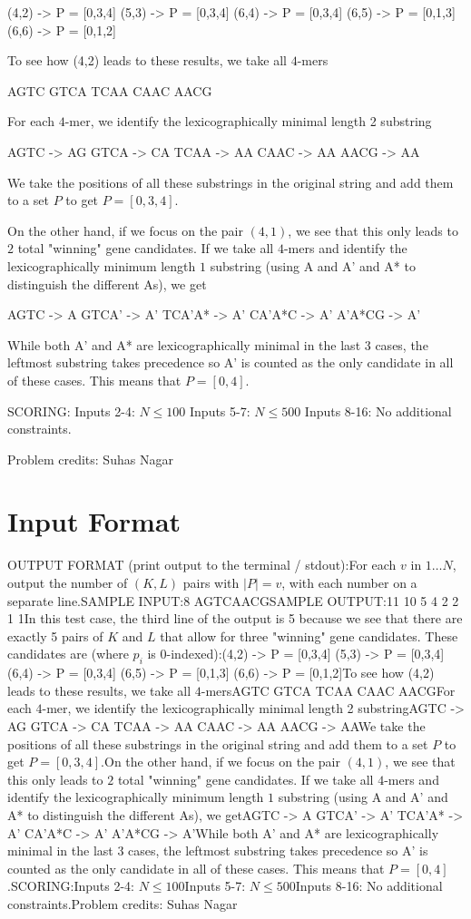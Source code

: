 \documentclass[12pt]{article}
\begin{document}
(4,2) -> P = [0,3,4]
(5,3) -> P = [0,3,4]
(6,4) -> P = [0,3,4]
(6,5) -> P = [0,1,3]
(6,6) -> P = [0,1,2]

To see how (4,2) leads to these results, we take all $4$-mers

AGTC
GTCA
TCAA
CAAC
AACG

For each $4$-mer, we identify the lexicographically minimal length 2 substring

AGTC -> AG
GTCA -> CA
TCAA -> AA
CAAC -> AA
AACG -> AA

We take the positions of all these substrings in the original string and add
them to a set $P$ to get $P = [0,3,4]$.

On the other hand, if we focus on the pair $(4,1)$, we see that this only leads
to $2$ total "winning" gene candidates. If we take all $4$-mers and identify the
lexicographically minimum length $1$ substring (using A and A' and A* to
distinguish the different As), we get

AGTC -> A
GTCA' -> A'
TCA'A* -> A'
CA'A*C -> A'
A'A*CG -> A'

While both A' and A* are lexicographically minimal in the last 3 cases, the
leftmost substring takes precedence so A' is counted as the only candidate in
all of these cases. This means that $P = [0,4]$.

SCORING:
Inputs 2-4: $N \leq 100$ Inputs 5-7: $N \leq 500$ Inputs 8-16: No additional constraints. 


Problem credits: Suhas Nagar



\section*{Input Format}
OUTPUT FORMAT (print output to the terminal / stdout):For each $v$ in $1\dots N$, output the number of $(K,L)$ pairs with $|P|=v$,
with each number on a separate line.SAMPLE INPUT:8
AGTCAACGSAMPLE OUTPUT:11
10
5
4
2
2
1
1In this test case, the third line of the output is 5 because we see that there are exactly 5 pairs of $K$ and $L$ that allow for
three "winning" gene candidates.  These candidates are (where $p_i$ is $0$-indexed):(4,2) -> P = [0,3,4]
(5,3) -> P = [0,3,4]
(6,4) -> P = [0,3,4]
(6,5) -> P = [0,1,3]
(6,6) -> P = [0,1,2]To see how (4,2) leads to these results, we take all $4$-mersAGTC
GTCA
TCAA
CAAC
AACGFor each $4$-mer, we identify the lexicographically minimal length 2 substringAGTC -> AG
GTCA -> CA
TCAA -> AA
CAAC -> AA
AACG -> AAWe take the positions of all these substrings in the original string and add
them to a set $P$ to get $P = [0,3,4]$.On the other hand, if we focus on the pair $(4,1)$, we see that this only leads
to $2$ total "winning" gene candidates. If we take all $4$-mers and identify the
lexicographically minimum length $1$ substring (using A and A' and A* to
distinguish the different As), we getAGTC -> A
GTCA' -> A'
TCA'A* -> A'
CA'A*C -> A'
A'A*CG -> A'While both A' and A* are lexicographically minimal in the last 3 cases, the
leftmost substring takes precedence so A' is counted as the only candidate in
all of these cases. This means that $P = [0,4]$.SCORING:Inputs 2-4: $N \leq 100$Inputs 5-7: $N \leq 500$Inputs 8-16: No additional constraints.Problem credits: Suhas Nagar
\end{document}
